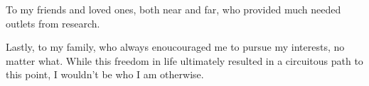 To my friends and loved ones, both near and far, who provided much needed outlets from research.

Lastly, to my family, who always enoucouraged me to pursue my interests, no matter what. While this freedom in life ultimately resulted in a circuitous path to this point, I wouldn't be who I am otherwise.

%
%
%
